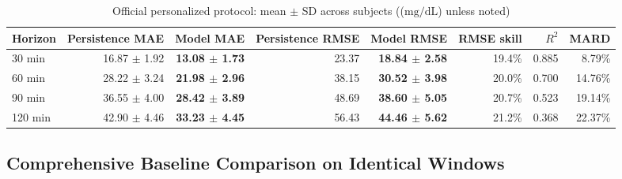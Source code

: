 \documentclass[journal]{IEEEtran}
\begin{document}
\begin{table}[t]
\centering
\caption{Official personalized protocol: mean $\pm$ SD across subjects (($\mathrm{mg/dL}$) unless noted)}
\label{tab:official}
\footnotesize
\begin{tabular}{lrrrrrrr}
\toprule
Horizon & Persistence MAE & Model MAE & Persistence RMSE & Model RMSE & RMSE skill & $R^2$ & MARD \\
\midrule
30 min & 16.87 $\pm$ 1.92 & \textbf{13.08 $\pm$ 1.73} & 23.37 & \textbf{18.84 $\pm$ 2.58} & 19.4\% & 0.885 & 8.79\% \\
60 min & 28.22 $\pm$ 3.24 & \textbf{21.98 $\pm$ 2.96} & 38.15 & \textbf{30.52 $\pm$ 3.98} & 20.0\% & 0.700 & 14.76\% \\
90 min & 36.55 $\pm$ 4.00 & \textbf{28.42 $\pm$ 3.89} & 48.69 & \textbf{38.60 $\pm$ 5.05} & 20.7\% & 0.523 & 19.14\% \\
120 min & 42.90 $\pm$ 4.46 & \textbf{33.23 $\pm$ 4.45} & 56.43 & \textbf{44.46 $\pm$ 5.62} & 21.2\% & 0.368 & 22.37\% \\
\bottomrule
\end{tabular}
\end{table}

\subsection{Comprehensive Baseline Comparison on Identical Windows}
\label{sec:baselines_identical}
\end{document}

